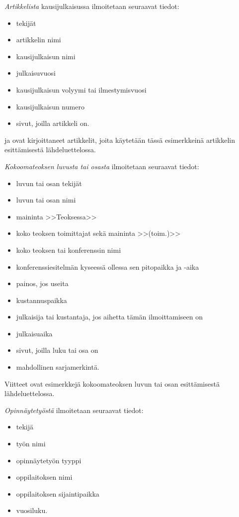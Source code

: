 \textit{Artikkelista} kausijulkaisussa ilmoitetaan seuraavat tiedot:

\begin{itemize}

\item[--]tekijät
\item[--]artikkelin nimi
\item[--]kausijulkaisun nimi
\item[--]julkaisuvuosi
\item[--]kausijulkaisun volyymi tai ilmestymisvuosi
\item[--]kausijulkaisun numero
\item[--]sivut, joilla artikkeli on.
\end{itemize}

\citet{bcs} ja \citet{Deschamps} ovat kirjoittaneet artikkelit, joita käytetään tässä esimerkkeinä artikkelin esittämisestä lähdeluettelossa.

\textit{Kokoomateoksen luvusta tai osasta} ilmoitetaan seuraavat tiedot:

\begin{itemize}
\item[--]luvun tai osan tekijät
\item[--]luvun tai osan nimi
\item[--]maininta >>Teoksessa>>
\item[--]koko teoksen toimittajat sekä maininta >>(toim.)>>
\item[--]koko teoksen tai konferenssin nimi
\item[--]konferenssiesitelmän kyseessä ollessa sen pitopaikka ja -aika
\item[--]painos, jos useita
\item[--]kustannuspaikka
\item[--]julkaisija tai kustantaja, jos aihetta tämän ilmoittamiseen on
\item[--]julkaisuaika
\item[--]sivut, joilla luku tai osa on 
\item[--]mahdollinen sarjamerkintä.
\end{itemize}

Viitteet \citep{Sihvola,Lindblom} ovat esimerkkejä
kokoomateoksen luvun tai osan esittämisestä lähdeluettelossa. 

\textit{Opinnäytetyöstä} ilmoitetaan seuraavat tiedot:

\begin{itemize}
\item[--]tekijä
\item[--]työn nimi
\item[--]opinnäytetyön tyyppi
\item[--]oppilaitoksen nimi
\item[--]oppilaitoksen sijaintipaikka
\item[--]vuosiluku.
\end{itemize}

